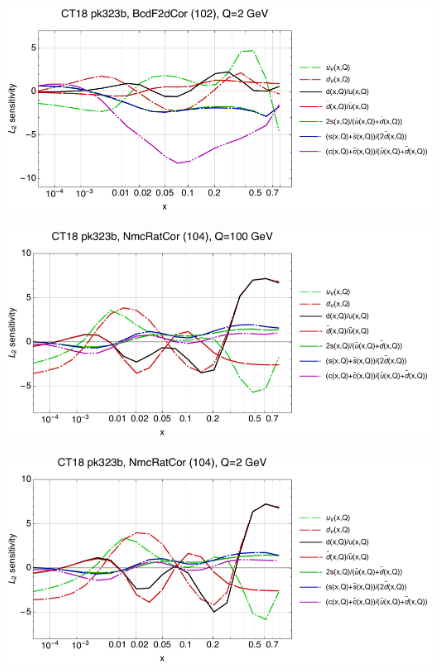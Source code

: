 \documentclass[10pt,aps,prd,floatfix,titlepage]{revtex4}
\begin{document}
\begin{figure}
\includegraphics[width=\textwidth,height=0.44\textheight,keepaspectratio]{2/102_ct18nn_q2_Sf_2.pdf}
\caption{}
\end{figure}
\clearpage
\begin{figure}
\includegraphics[width=\textwidth,height=0.44\textheight,keepaspectratio]{2/104_ct18nn_q100_Sf_2.pdf}
\caption{}
\end{figure}
\begin{figure}
\includegraphics[width=\textwidth,height=0.44\textheight,keepaspectratio]{2/104_ct18nn_q2_Sf_2.pdf}
\caption{}
\end{figure}
\end{document}
